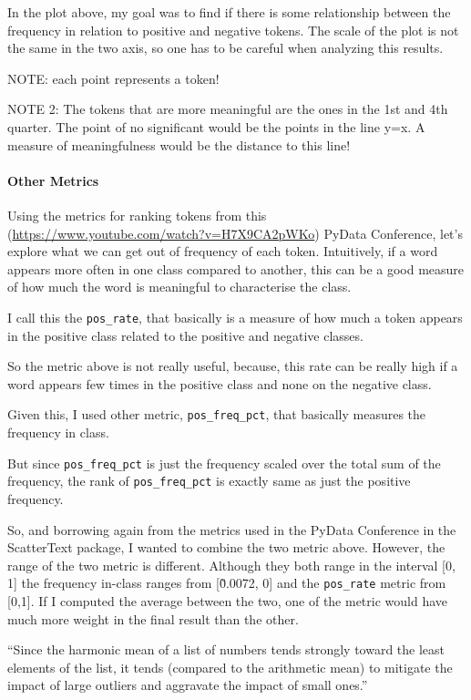 \documentclass{article}
\begin{document}
	In the plot above, my goal was to find if there is some relationship between the frequency in relation to positive and negative tokens. The scale of the plot is not the same in the two axis, so one has to be careful when analyzing this results.

NOTE: each point represents a token!

NOTE 2: The tokens that are more meaningful are the ones in the 1st and 4th quarter. The point of no significant would be the points in the line y=x. A measure of meaningfulness would be the distance to this line!

\paragraph{Other Metrics}


Using the metrics for ranking tokens from this (\url{https://www.youtube.com/watch?v=H7X9CA2pWKo}) PyData Conference, let’s explore what we can get out of frequency of each token. Intuitively, if a word appears more often in one class compared to another, this can be a good measure of how much the word is meaningful to characterise the class.

I call this the \texttt{pos\_rate}, that basically is a measure of how much a token appears in the positive class related to the positive and negative classes.

So the metric above is not really useful, because, this rate can be really high if a word appears few times in the positive class and none on the negative class.

Given this, I used other metric, \texttt{pos\_freq\_pct}, that basically measures the frequency in class.

But since \texttt{pos\_freq\_pct} is just the frequency scaled over the total sum of the frequency, the rank of \texttt{pos\_freq\_pct} is exactly same as just the positive frequency.

So, and borrowing again from the metrics used in the PyData Conference in the ScatterText package, I wanted to combine the two metric above. However, the range of the two metric is different. Although they both range in the interval [0, 1] the frequency in-class ranges from [\~0.0072, 0] and the \texttt{pos\_rate} metric from [0,1]. If I computed the average between the two, one of the metric would have much more weight in the final result than the other.

“Since the harmonic mean of a list of numbers tends strongly toward the least elements of the list, it tends (compared to the arithmetic mean) to mitigate the impact of large outliers and aggravate the impact of small ones.”
\end{document}
